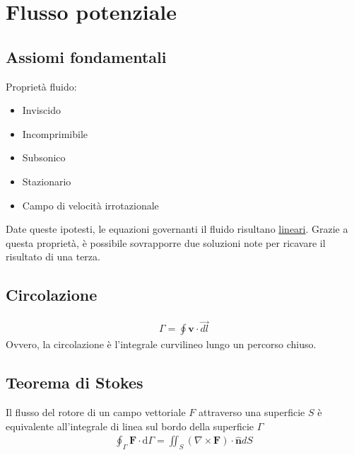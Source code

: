 \documentclass[11pt]{article}
\begin{document}
\section{Flusso potenziale}
\label{sec:org879273f}
\subsection{Assiomi fondamentali}
\label{sec:org1d2ed0a}
Proprietà fluido:
\begin{itemize}
\item Inviscido
\item Incomprimibile
\item Subsonico
\item Stazionario
\item Campo di velocità irrotazionale
\end{itemize}
Date queste ipotesti, le equazioni governanti il fluido risultano \uline{lineari}. Grazie a questa proprietà, è possibile sovrapporre due soluzioni note per ricavare il risultato di una terza.
\subsection{Circolazione}
\label{sec:org0746f43}
\begin{gather*}
    \Gamma = \oint \mathbf v \cdot \vec{dl}
    \end{gather*}
Ovvero, la circolazione è l'integrale curvilineo lungo un percorso chiuso.
\subsection{Teorema di Stokes}
\label{sec:orgc3b3821}
Il flusso del rotore di un campo vettoriale \(F\) attraverso una superficie \(S\) è equivalente all'integrale di linea sul bordo della superficie \(\Gamma\)
\begin{gather*}
\oint_{\Gamma} \mathbf{F} \cdot \mathrm{d} \Gamma=\iint_{S}(\nabla \times \mathbf{F}) \cdot \hat{\mathbf{n}} d S
\end{gather*}
\end{document}
